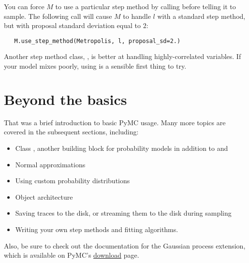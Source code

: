 You can force $M$ to use a particular step method by calling  before telling it to sample. The following call will cause $M$ to handle $l$ with a standard  step method, but with proposal standard deviation equal to $2$:
\begin{verbatim}
   M.use_step_method(Metropolis, l, proposal_sd=2.)
\end{verbatim}

Another step method class, , is better at handling highly-correlated variables. If your model mixes poorly, using  is a sensible first thing to try.

\section{Beyond the basics}
That was a brief introduction to basic PyMC usage. Many more topics are covered in the subsequent sections, including:
\begin{itemize}
   \item Class , another building block for probability models in addition to  and 
   \item Normal approximations
   \item Using custom probability distributions
   \item Object architecture
   \item Saving traces to the disk, or streaming them to the disk during sampling
   \item Writing your own step methods and fitting algorithms.
\end{itemize}
Also, be sure to check out the documentation for the Gaussian process extension,
which is available on PyMC's
\href{http://code.google.com/p/pymc/downloads/list}{download} page.
